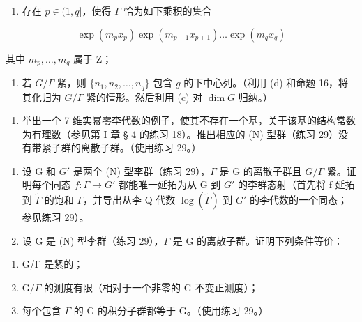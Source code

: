 \begin{enumerate}
\def\labelenumi{(\roman{enumi})}
\setcounter{enumi}{1}
\tightlist
\item
  存在 \(p \in (1, q]\)，使得 \(\Gamma\) 恰为如下乘积的集合
\end{enumerate}

\[
\exp (m _ {p} x _ {p}) \exp (m _ {p + 1} x _ {p + 1}) \dots \exp (m _ {q} x _ {q})
\]

其中 \(m_{p}, \ldots, m_{q}\) 属于 Z；

\begin{enumerate}
\def\labelenumi{(\roman{enumi})}
\setcounter{enumi}{2}
\tightlist
\item
  若 \(G / \Gamma\) 紧，则 \(\{n_1, n_2, \ldots, n_q\}\) 包含 \(g\) 的下中心列。（利用 (d) 和命题 16，将其化归为 \(G / \Gamma\) 紧的情形。然后利用 (c) 对 \(\dim G\) 归纳。）
\end{enumerate}

\begin{enumerate}
\def\labelenumi{(\arabic{enumi})}
\setcounter{enumi}{29}
\tightlist
\item
  举出一个 7 维实幂零李代数的例子，使其不存在一个基，关于该基的结构常数为有理数（参见第 I 章 § 4 的练习 18）。推出相应的 (N) 型群（练习 29）没有带紧子群的离散子群。（使用练习 29。）
\end{enumerate}

\begin{enumerate}
\def\labelenumi{\arabic{enumi}.}
\setcounter{enumi}{30}
\item
  设 G 和 \(G'\) 是两个 (N) 型李群（练习 29），\(\Gamma\) 是 G 的离散子群且 \(G/\Gamma\) 紧。证明每个同态 \(f: \Gamma \to G'\) 都能唯一延拓为从 G 到 \(G'\) 的李群态射（首先将 f 延拓到 \(\tilde{\Gamma}\) 的饱和 \(\Gamma\)，并导出从李 Q-代数 \(\log(\tilde{\Gamma})\) 到 \(G'\) 的李代数的一个同态；参见练习 29）。
\item
  设 G 是 (N) 型李群（练习 29），\(\Gamma\) 是 G 的离散子群。证明下列条件等价：
\end{enumerate}

\begin{enumerate}
\def\labelenumi{(\alph{enumi})}
\item
  G/Γ 是紧的；
\item
  \(\mathrm{G} / \Gamma\) 的测度有限（相对于一个非零的 G-不变正测度）；
\item
  每个包含 \(\Gamma\) 的 G 的积分子群都等于 G。（使用练习 29。）
\end{enumerate}

